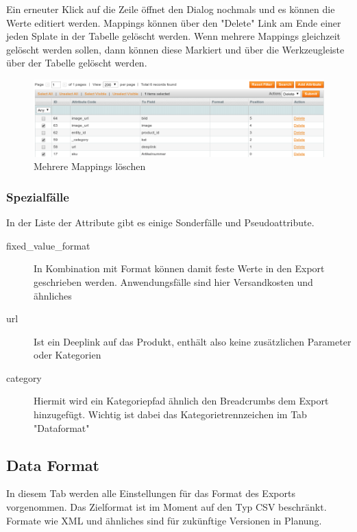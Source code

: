 \documentclass[a4paper,12pt]{book}
\begin{document}
Ein erneuter Klick auf die Zeile öffnet den Dialog nochmals und es
können die Werte editiert werden. Mappings können über den "Delete"
Link am Ende einer jeden Splate in der Tabelle gelöscht werden. Wenn
mehrere Mappings gleichzeit gelöscht werden sollen, dann können diese
Markiert und über die Werkzeugleiste über der Tabelle gelöscht werden.

\begin{figure}
 \includegraphics[width=1\textwidth]{img/bild07.png}
  \caption{Mehrere Mappings löschen}
  \label{figure:delete_massactions}
\end{figure}

\subsubsection{Spezialfälle}
In der Liste der Attribute gibt es einige Sonderfälle und
Pseudoattribute.

\begin{description}

\item[fixed\_value\_format] In Kombination mit Format können damit feste
Werte in den Export geschrieben werden. Anwendungsfälle sind hier
Versandkosten und ähnliches

\item[url] Ist ein Deeplink auf das Produkt, enthält also keine
zusätzlichen Parameter oder Kategorien

\item[category] Hiermit wird ein Kategoriepfad ähnlich den Breadcrumbs
dem Export hinzugefügt. Wichtig ist dabei das Kategorietrennzeichen im
Tab "Dataformat"
\end{description}

\subsection{Data Format}
In diesem Tab werden alle Einstellungen für das Format des Exports
vorgenommen. Das Zielformat ist im Moment auf den Typ CSV beschränkt.
Formate wie XML und ähnliches sind für zukünftige Versionen in
Planung.
\end{document}
